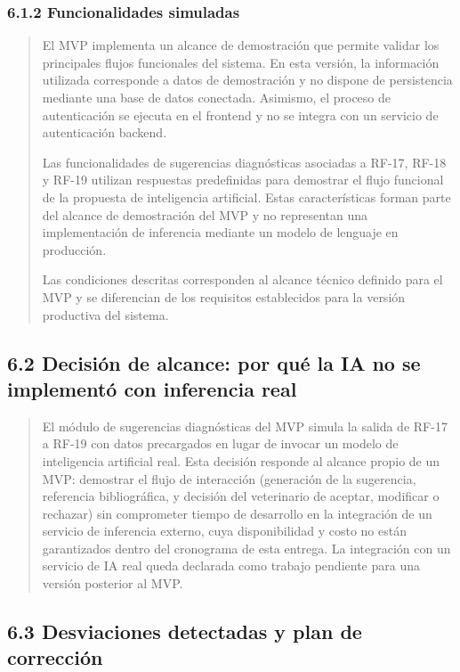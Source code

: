 \documentclass[
]{article}
\begin{document}
\subsubsection{6.1.2 Funcionalidades simuladas}\label{s6-1-2-funcionalidades-simuladas}

\begin{quote}
El MVP implementa un alcance de demostración que permite validar los principales flujos funcionales del sistema. En esta versión, la información utilizada corresponde a datos de demostración y no dispone de persistencia mediante una base de datos conectada. Asimismo, el proceso de autenticación se ejecuta en el frontend y no se integra con un servicio de autenticación backend.

Las funcionalidades de sugerencias diagnósticas asociadas a RF-17, RF-18 y RF-19 utilizan respuestas predefinidas para demostrar el flujo funcional de la propuesta de inteligencia artificial. Estas características forman parte del alcance de demostración del MVP y no representan una implementación de inferencia mediante un modelo de lenguaje en producción.

Las condiciones descritas corresponden al alcance técnico definido para el MVP y se diferencian de los requisitos establecidos para la versión productiva del sistema.
\end{quote}


\subsection{6.2 Decisión de alcance: por qué la IA no se implementó
con inferencia real}\label{s6-2-decision-de-alcance}

\begin{quote}
El módulo de sugerencias diagnósticas del MVP simula la salida de RF-17
a RF-19 con datos precargados en lugar de invocar un modelo de
inteligencia artificial real. Esta decisión responde al alcance propio
de un MVP: demostrar el flujo de interacción (generación de la
sugerencia, referencia bibliográfica, y decisión del veterinario de
aceptar, modificar o rechazar) sin comprometer tiempo de desarrollo en
la integración de un servicio de inferencia externo, cuya
disponibilidad y costo no están garantizados dentro del cronograma de
esta entrega. La integración con un servicio de IA real queda declarada
como trabajo pendiente para una versión posterior al MVP.
\end{quote}

\subsection{6.3 Desviaciones detectadas y plan de
corrección}\label{s6-3-desviaciones-detectadas}
\end{document}
